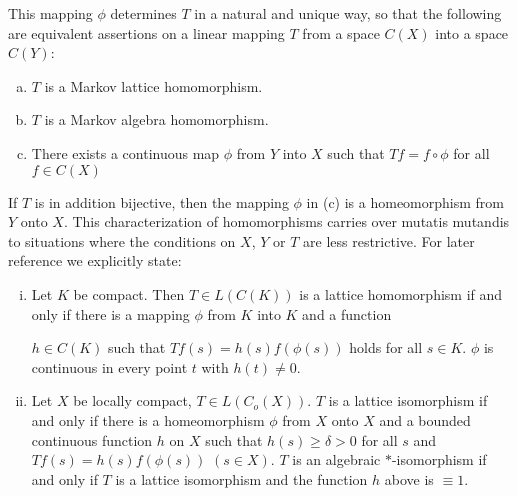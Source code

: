 This mapping $\phi$ determines $T$ in a natural and unique way, so that the following are equivalent assertions on a linear mapping $T$ from a space $C(X)$ into a space $C(Y)$:
\begin{enumerate}[(a)]
\item 
$T$ is a Markov lattice homomorphism.
\item 
$T$ is a Markov algebra homomorphism.
\item 
There exists a continuous map $\phi$ from $Y$ into $X$ such that $Tf = f \circ \phi$ for all $f \in C(X)$
\end{enumerate}
If $T$ is in addition bijective, then the mapping $\phi$ in (c) is a homeomorphism from $Y$ onto $X$.
This characterization of homomorphisms carries over mutatis mutandis to situations where the conditions on $X$, $Y$ or $T$ are less restrictive.
For later reference we explicitly state:
\begin{enumerate}[(i)]
\item Let $K$ be compact. Then $T \in L(C(K))$ is a lattice homomorphism if and only if there is a mapping $\phi$ from $K$ into $K$ and a function

\newpage

$h \in C(K)$ such that $Tf(s) = h(s)f(\phi(s))$ holds for all $s \in K$.
$\phi$ is continuous in every point $t$ with $h(t) \neq 0$.


\item Let $X$ be locally compact, $T \in L(C_{o}(X))$.
$T$ is a lattice isomorphism if and only if there is a homeomorphism $\phi$ from $X$ onto $X$ and a bounded continuous function $h$ on $X$ such that $h(s) \geq \delta > 0$ for all $s$ and $Tf(s) = h(s)f(\phi(s))$ $(s \in X)$.
$T$ is an algebraic $*$-isomorphism if and only if $T$ is a lattice isomorphism and the function $h$ above is $\equiv 1$.
\end{enumerate}






